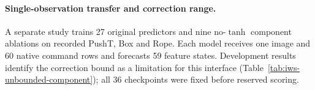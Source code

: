 
\paragraph{Single-observation transfer and correction range.}
A separate study trains 27 original predictors and nine no-$\tanh$ component
ablations on recorded PushT, Box and Rope. Each model receives one image and
60 native command rows and forecasts 59 feature states. Development results
identify the correction bound as a limitation for this interface
(Table~\ref{tab:iws-unbounded-component}); all 36 checkpoints were fixed before
reserved scoring.

